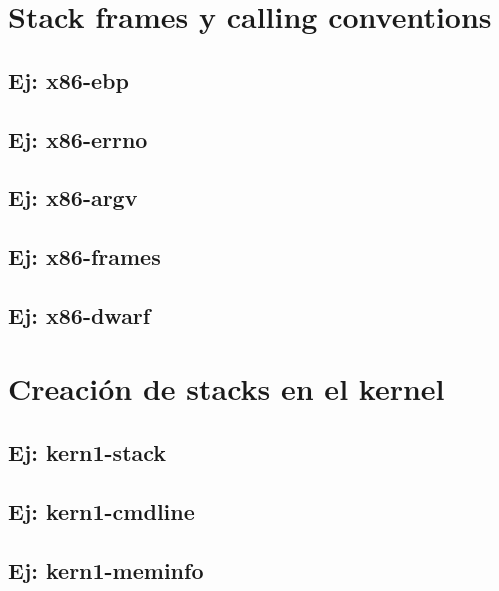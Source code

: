 \documentclass[a4paper]{article}
\begin{document}
\section{Stack frames y calling conventions}
\subsection{Ej: x86-ebp}
\subsection{Ej: x86-errno}
\subsection{Ej: x86-argv}
\subsection{Ej: x86-frames}
\subsection{Ej: x86-dwarf}
\section{Creación de stacks en el kernel}
\subsection{Ej: kern1-stack}
\subsection{Ej: kern1-cmdline}
\subsection{Ej: kern1-meminfo}
\end{document}
